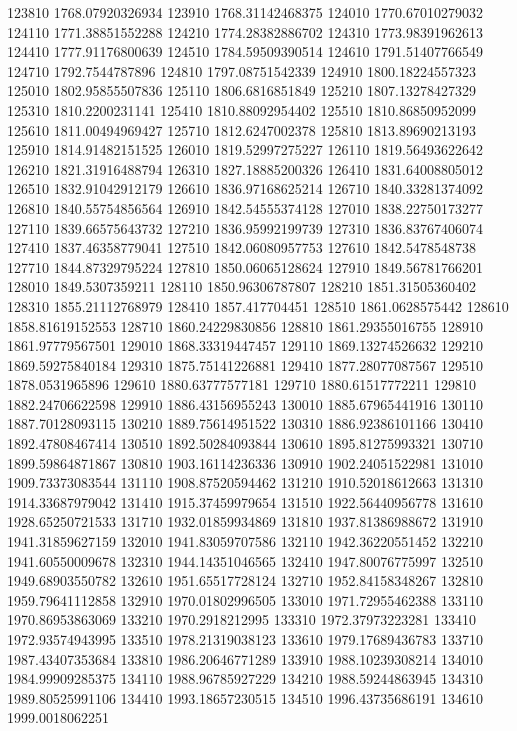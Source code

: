 {123810 1768.07920326934
123910 1768.31142468375
124010 1770.67010279032
124110 1771.38851552288
124210 1774.28382886702
124310 1773.98391962613
124410 1777.91176800639
124510 1784.59509390514
124610 1791.51407766549
124710 1792.7544787896
124810 1797.08751542339
124910 1800.18224557323
125010 1802.95855507836
125110 1806.6816851849
125210 1807.13278427329
125310 1810.2200231141
125410 1810.88092954402
125510 1810.86850952099
125610 1811.00494969427
125710 1812.6247002378
125810 1813.89690213193
125910 1814.91482151525
126010 1819.52997275227
126110 1819.56493622642
126210 1821.31916488794
126310 1827.18885200326
126410 1831.64008805012
126510 1832.91042912179
126610 1836.97168625214
126710 1840.33281374092
126810 1840.55754856564
126910 1842.54555374128
127010 1838.22750173277
127110 1839.66575643732
127210 1836.95992199739
127310 1836.83767406074
127410 1837.46358779041
127510 1842.06080957753
127610 1842.5478548738
127710 1844.87329795224
127810 1850.06065128624
127910 1849.56781766201
128010 1849.5307359211
128110 1850.96306787807
128210 1851.31505360402
128310 1855.21112768979
128410 1857.417704451
128510 1861.0628575442
128610 1858.81619152553
128710 1860.24229830856
128810 1861.29355016755
128910 1861.97779567501
129010 1868.33319447457
129110 1869.13274526632
129210 1869.59275840184
129310 1875.75141226881
129410 1877.28077087567
129510 1878.0531965896
129610 1880.63777577181
129710 1880.61517772211
129810 1882.24706622598
129910 1886.43156955243
130010 1885.67965441916
130110 1887.70128093115
130210 1889.75614951522
130310 1886.92386101166
130410 1892.47808467414
130510 1892.50284093844
130610 1895.81275993321
130710 1899.59864871867
130810 1903.16114236336
130910 1902.24051522981
131010 1909.73373083544
131110 1908.87520594462
131210 1910.52018612663
131310 1914.33687979042
131410 1915.37459979654
131510 1922.56440956778
131610 1928.65250721533
131710 1932.01859934869
131810 1937.81386988672
131910 1941.31859627159
132010 1941.83059707586
132110 1942.36220551452
132210 1941.60550009678
132310 1944.14351046565
132410 1947.80076775997
132510 1949.68903550782
132610 1951.65517728124
132710 1952.84158348267
132810 1959.79641112858
132910 1970.01802996505
133010 1971.72955462388
133110 1970.86953863069
133210 1970.2918212995
133310 1972.37973223281
133410 1972.93574943995
133510 1978.21319038123
133610 1979.17689436783
133710 1987.43407353684
133810 1986.20646771289
133910 1988.10239308214
134010 1984.99909285375
134110 1988.96785927229
134210 1988.59244863945
134310 1989.80525991106
134410 1993.18657230515
134510 1996.43735686191
134610 1999.0018062251
}
